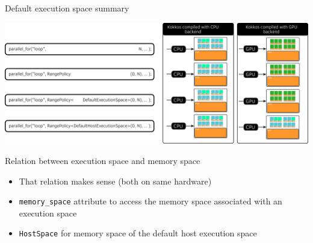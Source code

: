 \documentclass[aspectratio=169]{beamer}
\begin{document}

\begin{frame}{Default execution space summary}
    \begin{center}
        \includegraphics[width=\textwidth]{default_execution_space.png}
    \end{center}
\end{frame}


\begin{frame}[fragile]{Relation between execution space and memory space}
    \begin{itemize}
        \item That relation makes sense (both on same hardware)
        \item \texttt{memory\_space} attribute to access the memory space associated with an execution space
        \item \texttt{HostSpace} for memory space of the default host execution space
    \end{itemize}
    \begin{center}
    \end{center}
\end{frame}
\end{document}

